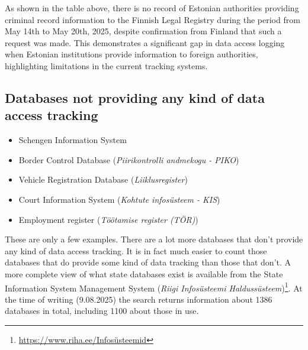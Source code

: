 As shown in the table above, there is no record of Estonian authorities providing criminal record information to the Finnish Legal Registry during the period from May 14th to May 20th, 2025, despite confirmation from Finland that such a request was made. This demonstrates a significant gap in data access logging when Estonian institutions provide information to foreign authorities, highlighting limitations in the current tracking systems.


\subsection{Databases not providing any kind of data access tracking}
\begin{itemize}
    \item Schengen Information System
    \item Border Control Database (\textit{Piirikontrolli andmekogu - PIKO})
    \item Vehicle Registration Database (\textit{Liiklusregister})
    \item Court Information System (\textit{Kohtute infosüsteem - KIS})
    \item Employment register (\textit{Töötamise register (TÖR)})

\end{itemize}

These are only a few examples. There are a lot more databases that don't provide any kind of data access tracking. It is in fact much easier to count those databases that do provide some kind of data tracking than those that don't. A more complete view of what state databases exist is available from the State Information System Management System (\textit{Riigi Infosüsteemi Haldussüsteem})\footnote{\url{https://www.riha.ee/Infosüsteemid}}. At the time of writing (9.08.2025) the search returns information about 1386 databases in total, including 1100 about those in use.


